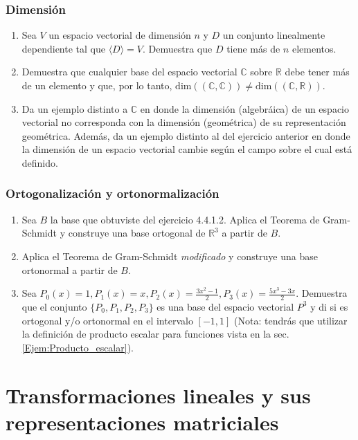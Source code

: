 \documentclass[12pt,dvipsnames]{article}
\begin{document}
\subsubsection{Dimensión}
\begin{enumerate}
    \item Sea $V$ un espacio vectorial de dimensión $n$ y $D$ un conjunto linealmente dependiente tal que $\langle D \rangle =V$. Demuestra que $D$ tiene más de $n$ elementos. 
    \item Demuestra que cualquier base del espacio vectorial $\mathbb{C}$ sobre $\mathbb{R}$ debe tener más de un elemento y que, por lo tanto, $\text{dim}((\mathbb{C},\mathbb{C}))\neq \text{dim}((\mathbb{C},\mathbb{R})).$ 
    \item Da un ejemplo distinto a $\mathbb{C}$ en donde la dimensión (algebráica) de un espacio vectorial no corresponda con la dimensión (geométrica) de su representación geométrica. Además, da un ejemplo distinto al del ejercicio anterior en donde la dimensión de un espacio vectorial cambie según el campo sobre el cual está definido. 
\end{enumerate}


\subsubsection{Ortogonalización y ortonormalización}
\begin{enumerate}
    \item Sea $B$ la base que obtuviste del ejercicio 4.4.1.2. Aplica el Teorema de Gram-Schmidt y construye una base ortogonal de $\mathbb{R}^3$ a partir de $B$. 
    \item Aplica el Teorema de Gram-Schmidt \emph{modificado} y construye una base ortonormal a partir de $B$. 
\item Sea $P_0(x)=1, P_1(x)=x, P_2(x)=\frac{3x^2-1}{2}, P_3(x)=\frac{5x^3-3x}{2}.$ Demuestra que el conjunto $\{P_0,P_1,P_2,P_3\}$ es una base del espacio vectorial $P^3$ y di si es ortogonal y/o ortonormal en el intervalo $[-1,1]$ (Nota: tendrás que utilizar la definición de producto escalar para funciones vista en la sec. \ref{Ejem:Producto_escalar}). 
\end{enumerate}

\section{Transformaciones lineales y sus representaciones matriciales} \label{Sec:Transformaciones lineales y sus representaciones matriciales} 
\end{document}
